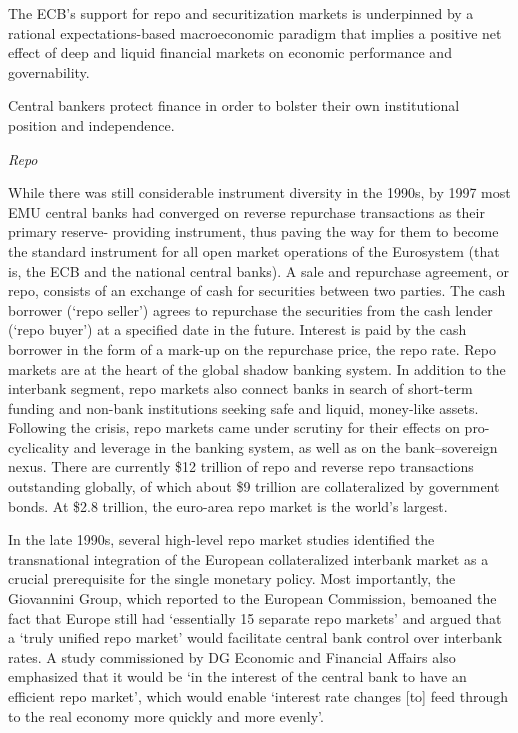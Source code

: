 \documentclass[
]{book}
\begin{document}
The ECB's support for repo and securitization markets is underpinned by
a rational expectations-based macroeconomic paradigm
that implies a positive net effect of deep and liquid financial markets on economic
performance and governability.

Central bankers protect finance in order to bolster their own
institutional position and independence.

\emph{Repo}

While there was still considerable instrument diversity in the 1990s, by 1997 most EMU
central banks had converged on reverse repurchase transactions as their primary reserve-
providing instrument, thus paving the way for them to become the
standard instrument for all open market operations of the Eurosystem (that is, the ECB and
the national central banks). A sale and repurchase agreement, or repo, consists of an
exchange of cash for securities between two parties. The cash borrower (`repo seller') agrees
to repurchase the securities from the cash lender (`repo buyer') at a specified date in the
future. Interest is paid by the cash borrower in the form of a mark-up on the repurchase
price, the repo rate. Repo markets are at the heart of the global shadow banking system. In
addition to the interbank segment, repo markets also connect banks in search of short-term
funding and non-bank institutions seeking safe and liquid, money-like assets.
Following the crisis, repo markets came under scrutiny for their effects on
pro-cyclicality and leverage in the banking system, as well as on the bank--sovereign nexus.
There are currently \$12 trillion of repo and reverse
repo transactions outstanding globally, of which about \$9 trillion are collateralized by
government bonds. At \$2.8 trillion, the euro-area repo market is the world's largest.

In the late
1990s, several high-level repo market studies identified the transnational integration of the
European collateralized interbank market as a crucial prerequisite for the single monetary
policy. Most importantly, the Giovannini Group, which reported to the European
Commission, bemoaned the fact that Europe still had `essentially 15 separate repo markets'
and argued that a `truly unified repo market' would facilitate central bank control over
interbank rates.
A study commissioned by DG Economic and
Financial Affairs also emphasized that it would be `in the interest of the central bank to have
an efficient repo market', which would enable `interest rate changes {[}to{]} feed through to the
real economy more quickly and more evenly'.
\end{document}
